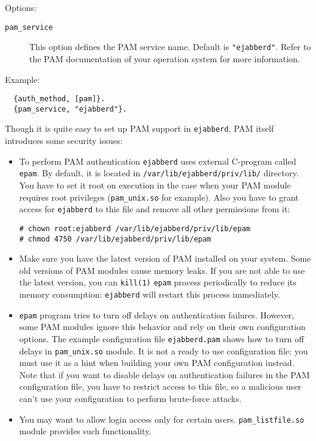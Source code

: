 \documentclass[a4paper,10pt]{book}
\newcommand{\ind}[1]{\begin{latexonly}\index{#1}\end{latexonly}}
\newcommand{\bracehack}{\def\{{\char"7B}\def\}{\char"7D}}
\newcommand{\titem}[1]{\item[\bracehack\texttt{#1}]}
\newcommand{\term}[1]{\texttt{#1}}
\newcommand{\ejabberd}{\texttt{ejabberd}}
\begin{document}
Options:
\begin{description}
\titem{pam\_service}\ind{options!pam\_service}This option defines the PAM service name.
Default is \term{"ejabberd"}. Refer to the PAM documentation of your operation system
for more information.
\end{description}

Example:
\begin{verbatim}
  {auth_method, [pam]}.
  {pam_service, "ejabberd"}.
\end{verbatim}

Though it is quite easy to set up PAM support in \ejabberd{}, PAM itself introduces some
security issues:

\begin{itemize}
\item To perform PAM authentication \ejabberd{} uses external C-program called
\term{epam}. By default, it is located in \verb|/var/lib/ejabberd/priv/lib/|
directory. You have to set it root on execution in the case when your PAM module
requires root privileges (\term{pam\_unix.so} for example). Also you have to grant access
for \ejabberd{} to this file and remove all other permissions from it:
\begin{verbatim}
# chown root:ejabberd /var/lib/ejabberd/priv/lib/epam
# chmod 4750 /var/lib/ejabberd/priv/lib/epam
\end{verbatim}
\item Make sure you have the latest version of PAM installed on your system.
Some old versions of PAM modules cause memory leaks. If you are not able to use the latest
version, you can \term{kill(1)} \term{epam} process periodically to reduce its memory
consumption: \ejabberd{} will restart this process immediately.
\item \term{epam} program tries to turn off delays on authentication failures.
However, some PAM modules ignore this behavior and rely on their own configuration options.
The example configuration file \term{ejabberd.pam} shows how to turn off delays in
\term{pam\_unix.so} module. It is not a ready to use configuration file: you must use it
as a hint when building your own PAM configuration instead. Note that if you want to disable
delays on authentication failures in the PAM configuration file, you have to restrict access
to this file, so a malicious user can't use your configuration to perform brute-force
attacks.
\item You may want to allow login access only for certain users. \term{pam\_listfile.so}
module provides such functionality.
\end{itemize}
\end{document}
